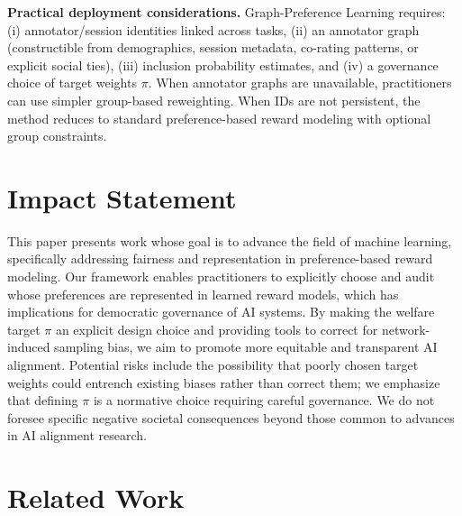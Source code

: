 \documentclass{article}
\theoremstyle{plain}
\theoremstyle{definition}
\theoremstyle{remark}
\begin{document}
\textbf{Practical deployment considerations.}
Graph-Preference Learning requires: (i) annotator/session identities linked
across tasks, (ii) an annotator graph
(constructible from demographics, session metadata, co-rating patterns, or explicit social ties),
(iii) inclusion probability estimates, and (iv) a
governance choice of target weights $\pi$. When annotator graphs are
unavailable, practitioners can use simpler group-based reweighting. When IDs are not persistent, the method
reduces to standard preference-based reward modeling with optional group
constraints.

\nocite{langley00}
\newpage
\section*{Impact Statement}
This paper presents work whose goal is to advance the field of machine learning, specifically addressing fairness and representation in preference-based reward modeling. Our framework enables practitioners to explicitly choose and audit whose preferences are represented in learned reward models, which has implications for democratic governance of AI systems. By making the welfare target $\pi$ an explicit design choice and providing tools to correct for network-induced sampling bias, we aim to promote more equitable and transparent AI alignment. Potential risks include the possibility that poorly chosen target weights could entrench existing biases rather than correct them; we emphasize that defining $\pi$ is a normative choice requiring careful governance. We do not foresee specific negative societal consequences beyond those common to advances in AI alignment research.




\newpage
\appendix
\onecolumn

\section{Related Work}
\label{sec:related}
\end{document}
